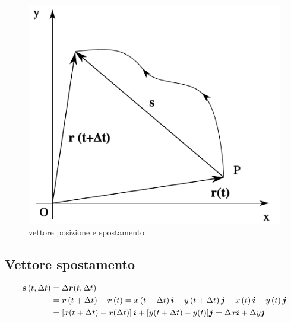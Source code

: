 \begin{figure}[htbp]
\centering
\includegraphics[scale=0.7]{immagini/fisica1/vettore_posizione}
\caption{vettore posizione e spostamento}
\end{figure}
\subsection{Vettore spostamento}
\parbox[c]{\textwidth}{
\begin{align*}
\boldsymbol{s}\left(t,\Delta t\right)&=\Delta \boldsymbol{r}(t,\Delta t)\\
&=\boldsymbol{r}\left(t+\Delta t\right)-\boldsymbol{r}\left(t\right)=x\left(t+\Delta t\right)\boldsymbol{i}+y\left(t+\Delta t\right)\boldsymbol{j}-x\left(t\right)\boldsymbol{i}-y\left(t\right)\boldsymbol{j}\\
&=\left[x(t+\Delta t)-x(\Delta t)\right]\boldsymbol{i}+[y(t+\Delta t)-y(t)]\boldsymbol{j}=\Delta x\boldsymbol{i}+\Delta y \boldsymbol{j}
\end{align*}
}
